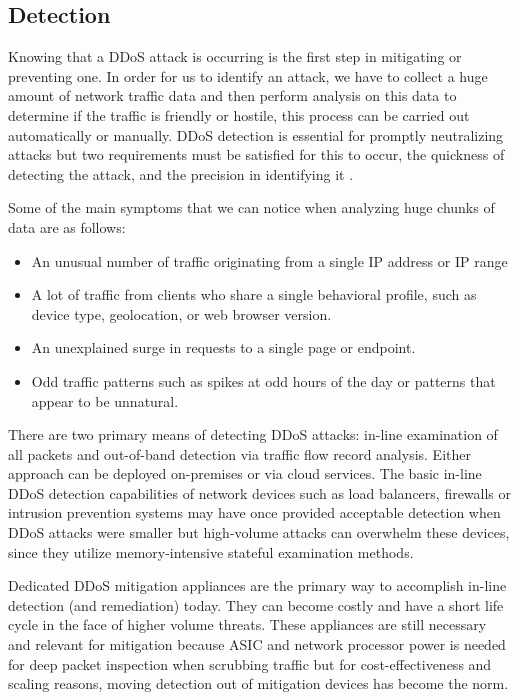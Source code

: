 \documentclass[a4paper, 12pt]{report} %
\begin{document}
                    \subsection{Detection}
                        Knowing that a DDoS attack is occurring is the first step in mitigating or preventing one. In order for us to identify an attack, we have to collect a huge amount of network traffic data and then perform analysis on this data to determine if the traffic is friendly or hostile, this process can be carried out automatically or manually. DDoS detection is essential for promptly neutralizing attacks but two requirements must be satisfied for this to occur, the quickness of detecting the attack, and the precision in identifying it \cite{kentikDDoSDetection}.

                        Some of the main symptoms that we can notice when analyzing huge chunks of data are as follows:

                        \begin{itemize}
                            \item An unusual number of traffic originating from a single IP address or IP range
                            \item A lot of traffic from clients who share a single behavioral profile, such as device type, geolocation, or web browser version.
                            \item An unexplained surge in requests to a single page or endpoint.
                            \item Odd traffic patterns such as spikes at odd hours of the day or patterns that appear to be unnatural.

                        \end{itemize}

                        There are two primary means of detecting DDoS attacks: in-line examination of all packets and out-of-band detection via traffic flow record analysis. Either approach can be deployed on-premises or via cloud services. The basic in-line DDoS detection capabilities of network devices such as load balancers, firewalls or intrusion prevention systems may have once provided acceptable detection when DDoS attacks were smaller but high-volume attacks can overwhelm these devices, since they utilize memory-intensive stateful examination methods.

                        Dedicated DDoS mitigation appliances are the primary way to accomplish in-line detection (and remediation) today. They can become costly and have a short life cycle in the face of higher volume threats. These appliances are still necessary and relevant for mitigation because ASIC and network processor power is needed for deep packet inspection when scrubbing traffic but for cost-effectiveness and scaling reasons, moving detection out of mitigation devices has become the norm.
\end{document}
